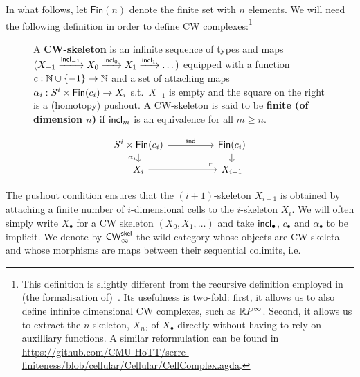 \documentclass[a4page]{article}
\begin{document}
In what follows, let $\mathsf{Fin}(n)$ denote the finite
set with $n$ elements. We will need the following definition in order to define CW complexes:\footnote{This definition is slightly different from the
  recursive definition employed in (the formalisation
  of)~\cite{BuchholtzFavonia18}. Its usefulness is two-fold: first, it
  allows us to also define infinite dimensional CW complexes, such as
  $\textnormal{\ensuremath{\mathbb{R}P^\infty}}$. Second, it allows us to extract the $n$-skeleton,
  $X_n$, of $X_{\bullet}$ directly without having to rely on
  auxilliary functions. A similar reformulation can be found in \url{https://github.com/CMU-HoTT/serre-finiteness/blob/cellular/Cellular/CellComplex.agda}.}
%
\begin{figure}[H]
\begin{minipage}{0.65 \linewidth}
\begin{definition}[CW skeleta]
  A \textbf{CW-skeleton} is an infinite sequence of types and maps
  $(X_{-1} \xrightarrow{\textnormal{\ensuremath{\mathsf{incl}_{-1}}}} X_0 \xrightarrow{\textnormal{\ensuremath{\mathsf{incl}_{0}}}} X_1 \xrightarrow{\textnormal{\ensuremath{\mathsf{incl}_{1}}}} \dots )$
  equipped with a function $c : \textsf{$\mathbb{N}$}\cup\{-1\} \to \textsf{$\mathbb{N}$}$ and a set of attaching maps $\alpha_i : S^i \times \textnormal{\ensuremath{\mathsf{Fin}({c_i})}} \to X_i$ s.t.\ $X_{-1}$ is empty and the square on the right is a (homotopy) pushout. A CW-skeleton is said to be \textbf{finite (of dimension $n$)} if $\textnormal{\ensuremath{\mathsf{incl}_{m}}}$ is
an equivalence for all $m \geq n$.
\end{definition}
\end{minipage}
\begin{minipage}{0.35 \linewidth}
  \[
\begin{tikzcd}[ampersand replacement=\& , row sep = small]
	{S^{i} \times \fin{c_i}} \&\& \fin{c_i} \\
	{X_i} \&\& {X_{i+1}}
	\arrow["{\mathsf{snd}}", from=1-1, to=1-3]
	\arrow["{\alpha_{i}}"', from=1-1, to=2-1]
	\arrow[from=2-1, to=2-3]
	\arrow[from=1-3, to=2-3]
	\arrow["\lrcorner"{anchor=center, pos=0.125, rotate=180}, draw=none, from=2-3, to=1-1]
\end{tikzcd}
\]
\end{minipage}
\end{figure}
%
The pushout condition ensures that the \( (i+1) \)-skeleton \( X_{i+1} \) is
obtained by attaching a finite number of \( i \)-dimensional cells to the
\( i \)-skeleton \( X_i \).
%
We will often simply write $X_\bullet$ for a CW skeleton $(X_0,X_1,\dots)$ and
take $\textnormal{\ensuremath{\mathsf{incl}_{\bullet}}}$, $c_{\bullet}$ and $ \alpha_{\bullet}$ to be implicit.
%
We denote by $\textnormal{\ensuremath{\mathsf{CW}_\infty^{\mathsf{skel}}}}$ the wild category whose objects are CW skeleta and
whose morphisms are maps between their sequential colimits, i.e.\
\end{document}

